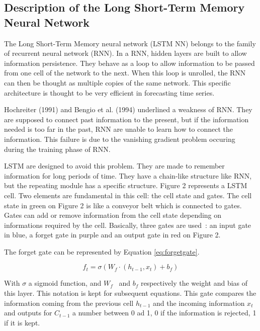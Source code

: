 \subsection{Description of the Long Short-Term Memory Neural Network}

The Long Short-Term Memory neural network (LSTM NN) belongs to the family of recurrent neural network (RNN). 
In a RNN, hidden layers are built to allow information persistence. They behave as a loop to allow information 
to be passed from one cell of the network to the next. When this loop is unrolled, the RNN can then be thought 
as multiple copies of the same network. This specific architecture is thought to be very efficient in 
forecasting time series. 

Hochreiter (1991) and Bengio et al. (1994) underlined a weakness of RNN. They are supposed to connect past 
information to the present, but if the information needed is too far in the past, RNN are unable to learn 
how to connect the information. This failure is due to the vanishing gradient problem occuring during the 
training phase of RNN. 

LSTM are designed to avoid this problem. They are made to remember information for long periods of time. 
They have a chain-like structure like RNN, but the repeating module has a specific structure. 
Figure 2 represents a LSTM cell. Two elements are fundamental in this cell: the cell state and gates. 
The cell state in green on Figure 2 is like a conveyor belt which is connected to gates. 
Gates can add or remove information from the cell state depending on informations required by the cell. 
Basically, three gates are used : an input gate in blue, a forget gate in purple and an output gate in red 
on Figure 2. 


The forget gate can be represented by Equation \ref{eq:forgetgate}. 



\begin{equation}\label{eq:forgetgate}
 f_{t} = \sigma  \left( W_f \cdot  \left( h_{t-1}, x_t \right) + b_f \right)
\end{equation}

\vspace{\baselineskip}

With  \(  \sigma  \)  a sigmoid function, and  \( W_{f} \) \  and  \( b_{f} \)  respectively the 
weight and bias of this layer. This notation is kept for subsequent equations. This gate compares 
the information coming from the previous cell  \( h_{t-1} \) and the incoming information  \( x_{t} \)  
and outputs for  \( C_{t-1}  \) a number between 0 ad 1, 0 if the information is rejected, 1 if it is kept.


